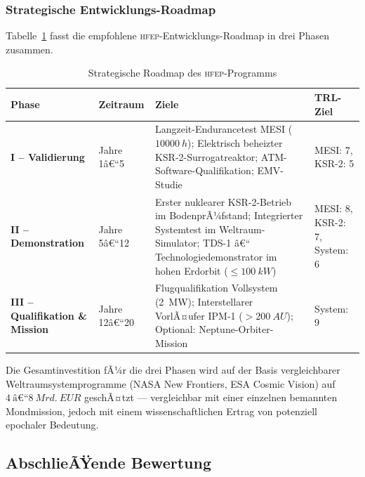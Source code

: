 ﻿\documentclass[a4paper,12pt,twoside]{article}
\theoremstyle{plain}
\theoremstyle{definition}
\theoremstyle{remark}
\newcommand{\HFEP}{\textsc{hfep}}
\begin{document}
	\subsubsection{Strategische Entwicklungs-Roadmap}

	Tabelle~\ref{tab:roadmap} fasst die empfohlene \HFEP-Entwicklungs-Roadmap
	in drei Phasen zusammen.

	\begin{table}[H]
		\centering
		\caption{Strategische Roadmap des \HFEP-Programms}
		\label{tab:roadmap}
		\renewcommand{\arraystretch}{1.4}
		\begin{tabular}{p{2.6cm}p{4.2cm}p{4.2cm}p{3.2cm}}
			\toprule
			\textbf{Phase} & \textbf{Zeitraum} & \textbf{Ziele} & \textbf{TRL-Ziel}\\
			\midrule
			\textbf{I -- Validierung} &
			Jahre 1â€“5 &
			Langzeit-Endurancetest MESI ($\SI{10000}{h}$); Elektrisch beheizter
			KSR-2-Surrogatreaktor; ATM-Software-Qualifikation; EMV-Studie &
			MESI: 7, KSR-2: 5\\[4pt]

			\textbf{II -- Demonstration} &
			Jahre 5â€“12 &
			Erster nuklearer KSR-2-Betrieb im BodenprÃ¼fstand; Integrierter
			Systemtest im Weltraum-Simulator; TDS-1 â€“ Technologiedemonstrator
			im hohen Erdorbit ($\leq\SI{100}{kW}$) &
			MESI: 8, KSR-2: 7, System: 6\\[4pt]

			\textbf{III -- Qualifikation \& Mission} &
			Jahre 12â€“20 &
			Flugqualifikation Vollsystem (\SI{2}{MW}); Interstellarer
			VorlÃ¤ufer IPM-1 ($>\SI{200}{AU}$); Optional:
			Neptune-Orbiter-Mission &
			System: 9\\
			\bottomrule
		\end{tabular}
	\end{table}

	Die Gesamtinvestition fÃ¼r die drei Phasen wird auf der Basis
	vergleichbarer Weltraumsystemprogramme (NASA New Frontiers, ESA
	Cosmic Vision) auf $\SI{4}{â€“}\SI{8}{Mrd.\ EUR}$ geschÃ¤tzt ---
	vergleichbar mit einer einzelnen bemannten Mondmission, jedoch mit
	einem wissenschaftlichen Ertrag von potenziell epochaler Bedeutung.

	\subsection{AbschlieÃŸende Bewertung}
	\label{sec:final_assessment}
\end{document}
